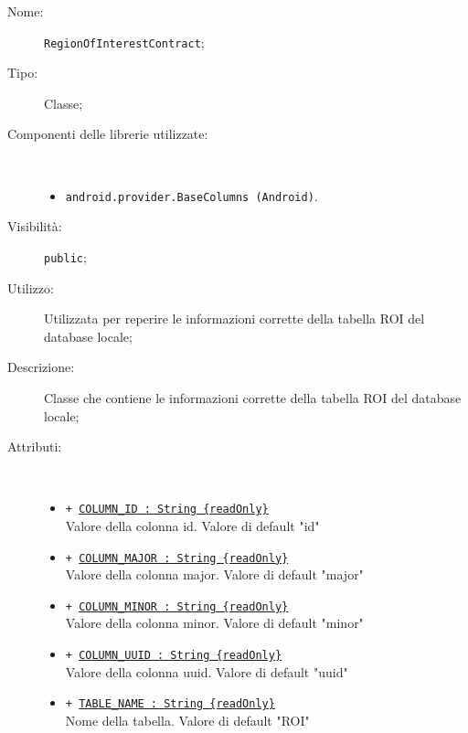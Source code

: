 \documentclass[../DefinizioneDiProdotto.tex]{subfiles}
\begin{document}
\begin{description}
	\item[Nome:] \texttt{RegionOfInterestContract};
	\item[Tipo:] Classe;
	\item[Componenti delle librerie utilizzate:] \
	\begin{itemize}
		\item \texttt{android.provider.BaseColumns (Android)}.
		
	\end{itemize}
	\item[Visibilità:] \texttt{public};
	\item[Utilizzo:] Utilizzata per reperire le informazioni corrette della tabella ROI del database locale;
	\item[Descrizione:] Classe che contiene le informazioni corrette della tabella ROI del database locale;
	\item[Attributi:] \
	\begin{itemize}
		\item \texttt{+ \underline{COLUMN\_ID : String \{readOnly\}}}\\
		Valore della colonna id. Valore di default "id"
		
		\item \texttt{+ \underline{COLUMN\_MAJOR : String \{readOnly\}}}\\
		Valore della colonna major. Valore di default "major"
		
		\item \texttt{+ \underline{COLUMN\_MINOR : String \{readOnly\}}}\\
		Valore della colonna minor. Valore di default "minor"
		
		\item \texttt{+ \underline{COLUMN\_UUID : String \{readOnly\}}}\\
		Valore della colonna uuid. Valore di default "uuid"
		
		\item \texttt{+ \underline{TABLE\_NAME : String \{readOnly\}}}\\
		Nome della tabella. Valore di default "ROI"
		
	\end{itemize}
\end{description}
\end{document}
